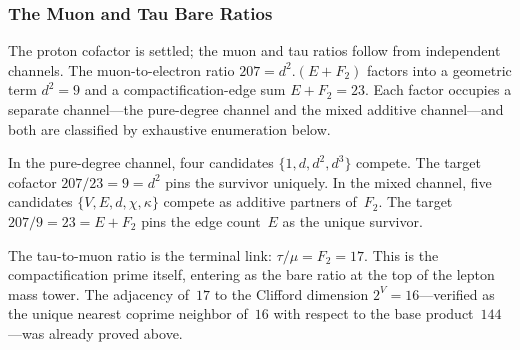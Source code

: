 \documentclass[11pt,a4paper]{book}
\def\cdot{.}%
\begin{document}
\begin{code}
\>[0][@{}l@{\AgdaIndent{0}}]%
\>[2]\AgdaSymbol{\{}\AgdaSpace{}%
\AgdaSpace{}%
\AgdaSymbol{=}\AgdaSpace{}%
\<%
\\
%
\>[2]\AgdaSymbol{;}\AgdaSpace{}%
\AgdaSpace{}%
\AgdaSymbol{=}\AgdaSpace{}%
\<%
\\
%
\>[2]\AgdaSymbol{;}\AgdaSpace{}%
\AgdaSpace{}%
\AgdaSymbol{=}\AgdaSpace{}%
\<%
\\
%
\>[2]\AgdaSymbol{;}\AgdaSpace{}%
\AgdaSpace{}%
\AgdaSymbol{=}\AgdaSpace{}%
\<%
\\
%
\>[2]\AgdaSymbol{;}\AgdaSpace{}%
\AgdaSpace{}%
\AgdaSymbol{=}\AgdaSpace{}%
\<%
\\
%
\>[2]\AgdaSymbol{\}}\<%
\end{code}

\subsubsection*{The Muon and Tau Bare Ratios}

The proton cofactor is settled; the muon and tau ratios follow from
independent channels.  The muon-to-electron ratio $207 = d^2 \cdot (E + F_2)$
factors into a geometric term $d^2 = 9$ and a compactification-edge
sum $E + F_2 = 23$.  Each factor occupies a separate channel---the
pure-degree channel and the mixed additive channel---and both are
classified by exhaustive enumeration below.

In the pure-degree channel, four candidates $\{1, d, d^2, d^3\}$
compete.  The target cofactor $207/23 = 9 = d^2$ pins the survivor
uniquely.  In the mixed channel, five candidates
$\{V, E, d, \chi, \kappa\}$ compete as additive partners of~$F_2$.
The target $207/9 = 23 = E + F_2$ pins the edge count~$E$ as
the unique survivor.

The tau-to-muon ratio is the terminal link: $\tau/\mu = F_2 = 17$.
This is the compactification prime itself, entering as the bare ratio
at the top of the lepton mass tower.  The adjacency of~$17$ to the
Clifford dimension $2^V = 16$---verified as the unique nearest
coprime neighbor of~$16$ with respect to the base product~$144$---was
already proved above.
\end{document}
